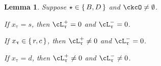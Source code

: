 \documentclass[12pt,a4paper]{amsart}
\numberwithin{equation}{section}
\newtheorem{lem}[thm]{Lemma}
\theoremstyle{remark}
\begin{document}
\begin{lem}\label{lem:BD2}
Suppose $\star \in \set{B,D}$ and $\ckcO \neq \emptyset$.
\begin{enuma}
  \item If $x_{\uptau}=s$, then $\ac_{\uptau}^{+} =0$ and $\ac_{\uptau}^{-}=0$.
  \item If $x_{\uptau}\in \set{r,c}$, then $\ac_{\uptau}^{+} \neq 0$ and $\ac_{\uptau}^{-}=0$.
  \item If $x_{\uptau}=d$, then $\ac_{\uptau}^{+} \neq 0$ and
  $\ac_{\uptau}^{-}\neq 0$.
\end{enuma}
\end{lem}
\end{document}
